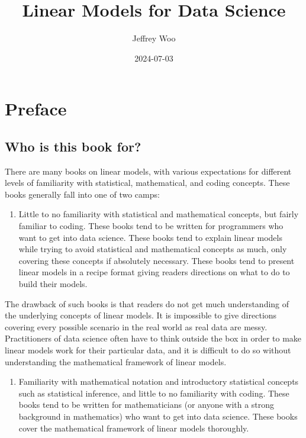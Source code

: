 \documentclass[
]{book}
\title{Linear Models for Data Science}
\author{Jeffrey Woo}
\date{2024-07-03}
\providecommand{\tightlist}{%
  \setlength{\itemsep}{0pt}\setlength{\parskip}{0pt}}
\begin{document}
\maketitle

{
\setcounter{tocdepth}{1}
\tableofcontents
}
\hypertarget{preface}{%
\chapter*{Preface}\label{preface}}

\hypertarget{who-is-this-book-for}{%
\section*{Who is this book for?}\label{who-is-this-book-for}}

There are many books on linear models, with various expectations for different levels of familiarity with statistical, mathematical, and coding concepts. These books generally fall into one of two camps:

\begin{enumerate}
\def\labelenumi{\arabic{enumi}.}
\tightlist
\item
  Little to no familiarity with statistical and mathematical concepts, but fairly familiar to coding. These books tend to be written for programmers who want to get into data science. These books tend to explain linear models while trying to avoid statistical and mathematical concepts as much, only covering these concepts if absolutely necessary. These books tend to present linear models in a recipe format giving readers directions on what to do to build their models.
\end{enumerate}

The drawback of such books is that readers do not get much understanding of the underlying concepts of linear models. It is impossible to give directions covering every possible scenario in the real world as real data are messy. Practitioners of data science often have to think outside the box in order to make linear models work for their particular data, and it is difficult to do so without understanding the mathematical framework of linear models.

\begin{enumerate}
\def\labelenumi{\arabic{enumi}.}
\setcounter{enumi}{1}
\tightlist
\item
  Familiarity with mathematical notation and introductory statistical concepts such as statistical inference, and little to no familiarity with coding. These books tend to be written for mathematicians (or anyone with a strong background in mathematics) who want to get into data science. These books cover the mathematical framework of linear models thoroughly.
\end{enumerate}
\end{document}
